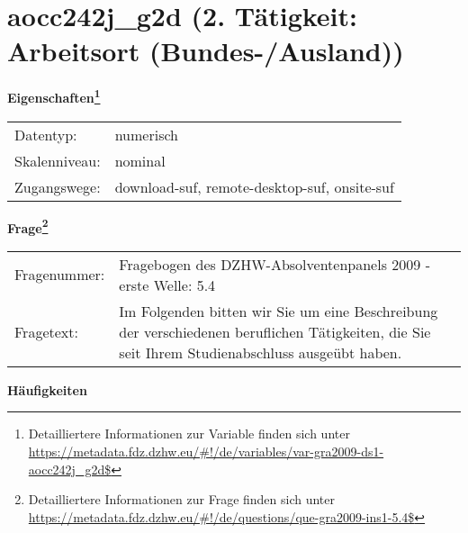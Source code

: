 
    \setcounter{footnote}{0}

    \vspace*{-1.8cm}
	\section{aocc242j\_g2d (2. Tätigkeit: Arbeitsort (Bundes-/Ausland))}
	\label{section:aocc242j_g2d}



    \vspace*{0.5cm}
    \noindent\textbf{Eigenschaften\footnote{Detailliertere Informationen zur Variable finden sich unter
		\url{https://metadata.fdz.dzhw.eu/\#!/de/variables/var-gra2009-ds1-aocc242j_g2d$}}}\\
	\begin{tabularx}{\hsize}{@{}lX}
	Datentyp: & numerisch \\
	Skalenniveau: & nominal \\
	Zugangswege: &
	  download-suf, 
	  remote-desktop-suf, 
	  onsite-suf
 \\
    \end{tabularx}



				\vspace*{0.5cm}
                \noindent\textbf{Frage\footnote{Detailliertere Informationen zur Frage finden sich unter
		              \url{https://metadata.fdz.dzhw.eu/\#!/de/questions/que-gra2009-ins1-5.4$}}}\\
				\begin{tabularx}{\hsize}{@{}lX}
					Fragenummer: &
					  Fragebogen des DZHW-Absolventenpanels 2009 - erste Welle:
					  5.4
 \\
					Fragetext: & Im Folgenden bitten wir Sie um eine Beschreibung der verschiedenen beruflichen Tätigkeiten, die Sie seit Ihrem Studienabschluss ausgeübt haben. \\
				\end{tabularx}





        		\vspace*{0.5cm}
                \noindent\textbf{Häufigkeiten}

